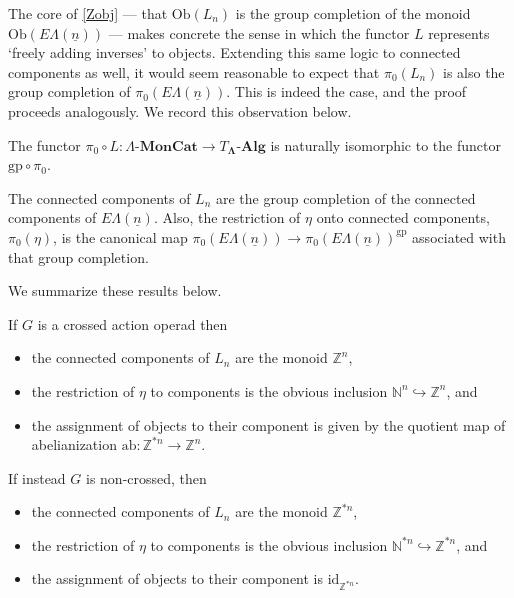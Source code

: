 \documentclass{amsbook} %
\newcommand{\mb}{\mathbf}
\newcommand{\id}{\textrm{id}}
\newcommand{\ML}{\mathbf{\Lambda}}
\newcommand{\ELn}{E\Lambda(\underline{n})}
\newcommand{\lmc}{\Lambda\mbox{-}\mb{MonCat}}
\numberwithin{section}{chapter}
\begin{document}
The core of \cref{Zobj} --- that $\mathrm{Ob}(L_n)$ is the group completion of the monoid $\mathrm{Ob}(\ELn)$ --- makes concrete the sense in which the functor $L$ represents `freely adding inverses' to objects. Extending this same logic to connected components as well, it would seem reasonable to expect that $\pi_0(L_n)$ is also the group completion of $\pi_0(\ELn)$. This is indeed the case, and the proof proceeds analogously. We record this observation below. 

\begin{prop}\label{pilel_gppiel}
The functor $\pi_0 \circ L \colon  \lmc \to T_{\ML}\mbox{-}\mb{Alg}$ is naturally isomorphic to the functor $\mathrm{gp} \circ \pi_0$.
\end{prop}

\begin{cor}\label{Zconcomp} The connected components of $L_n$ are the group completion of the connected components of $\ELn$. Also, the restriction of $\eta$ onto connected components, $\pi_0(\eta)$, is the canonical map $\pi_0(\ELn) \to \pi_0(\ELn)^{\mathrm{gp}}$ associated with that group completion.
\end{cor}

We summarize these results below.
\begin{cor}\label{crossconcomp} If $G$ is a crossed action operad then
\begin{itemize} 
\item the connected components of $L_n$ are the monoid $\mathbb{Z}^n$,
\item the restriction of $\eta$ to components is the obvious inclusion $\mathbb{N}^n \hookrightarrow \mathbb{Z}^n$, and
\item the assignment of objects to their component is given by the quotient map of abelianization $\mathrm{ab} \colon  \mathbb{Z}^{\ast n} \to \mathbb{Z}^n$.
\end{itemize}
If instead $G$ is non-crossed, then
\begin{itemize} \itemsep0em
\item the connected components of $L_n$ are the monoid $\mathbb{Z}^{\ast n}$,
\item the restriction of $\eta$ to components is the obvious inclusion $\mathbb{N}^{\ast n} \hookrightarrow \mathbb{Z}^{\ast n}$, and
\item the assignment of objects to their component is $\id_{\mathbb{Z}^{\ast n}}$.
\end{itemize}
\end{cor}
\end{document}
